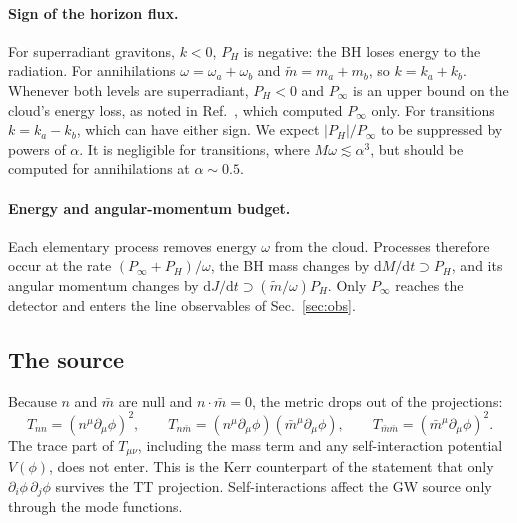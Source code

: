 \documentclass[11pt]{article}
\newcommand{\dd}{\mathrm{d}}
\begin{document}
\paragraph{Sign of the horizon flux.} For superradiant gravitons, $k<0$, $P_H$ is negative: the BH loses energy to the radiation. For annihilations $\omega=\omega_a+\omega_b$ and $\tilde m=m_a+m_b$, so $k=k_a+k_b$. Whenever both levels are superradiant, $P_H<0$ and $P_\infty$ is an upper bound on the cloud's energy loss, as noted in Ref.~\cite{YK14}, which computed $P_\infty$ only. For transitions $k=k_a-k_b$, which can have either sign. We expect $|P_H|/P_\infty$ to be suppressed by powers of $\alpha$. It is negligible for transitions, where $M\omega\lesssim\alpha^3$, but should be computed for annihilations at $\alpha\sim0.5$.

\paragraph{Energy and angular-momentum budget.} Each elementary process removes energy $\omega$ from the cloud. Processes therefore occur at the rate $(P_\infty+P_H)/\omega$, the BH mass changes by $\dd M/\dd t\supset P_H$, and its angular momentum changes by $\dd J/\dd t\supset(\tilde m/\omega)P_H$. Only $P_\infty$ reaches the detector and enters the line observables of Sec.~\ref{sec:obs}.

\subsection{The source}

Because $n$ and $\bar m$ are null and $n\cdot\bar m=0$, the metric drops out of the projections:
\begin{equation}
T_{nn}=(n^\mu\partial_\mu\phi)^2,\qquad T_{n\bar m}=(n^\mu\partial_\mu\phi)(\bar m^\mu\partial_\mu\phi),\qquad T_{\bar m\bar m}=(\bar m^\mu\partial_\mu\phi)^2 .
\label{eq:Tproj}
\end{equation}
The trace part of $T_{\mu\nu}$, including the mass term and any self-interaction potential $V(\phi)$, does not enter. This is the Kerr counterpart of the statement that only $\partial_i\phi\,\partial_j\phi$ survives the TT projection. Self-interactions affect the GW source only through the mode functions.
\end{document}
